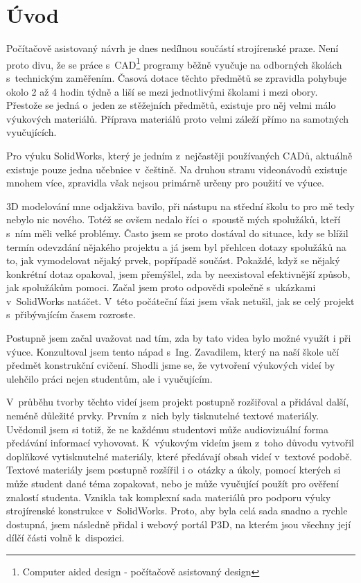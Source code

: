 \chapter*{Úvod}
Počítačově asistovaný návrh je dnes nedílnou součástí strojírenské praxe.
Není proto divu, že se práce s~CAD\footnote{Computer aided design - počítačově asistovaný design} programy běžně vyučuje na odborných školách s~technickým zaměřením.
Časová dotace těchto předmětů se zpravidla pohybuje okolo 2 až 4 hodin týdně a liší se mezi jednotlivými školami i mezi obory.
Přestože se jedná o~jeden ze stěžejních předmětů, existuje pro něj velmi málo výukových materiálů.
Příprava materiálů proto velmi záleží přímo na samotných vyučujících.

Pro výuku SolidWorks, který je jedním z~nejčastěji používaných CADů, aktuálně existuje pouze jedna učebnice v~češtině.
Na druhou stranu videonávodů existuje mnohem více, zpravidla však nejsou primárně určeny pro použití ve výuce.

3D modelování mne odjakživa bavilo, při nástupu na střední školu to pro mě tedy nebylo nic nového.
Totéž se ovšem nedalo říci o~spoustě mých spolužáků, kteří s~ním měli velké problémy.
Často jsem se proto dostával do situace, kdy se blížil termín odevzdání nějakého projektu a já jsem byl přehlcen dotazy spolužáků na to, jak vymodelovat nějaký prvek, popřípadě součást.
Pokaždé, když se nějaký konkrétní dotaz opakoval, jsem přemýšlel, zda by neexistoval efektivnější způsob, jak spolužákům pomoci.
Začal jsem proto odpovědi společně s~ukázkami v~SolidWorks natáčet.
V~této počáteční fázi jsem však netušil, jak se celý projekt s~přibývajícím časem rozroste.

Postupně jsem začal uvažovat nad tím, zda by tato videa bylo možné využít i při výuce.
Konzultoval jsem tento nápad s~Ing. Zavadilem, který na naší škole učí předmět konstrukční cvičení.
Shodli jsme se, že vytvoření výukových videí by ulehčilo práci nejen studentům, ale i vyučujícím.

V~průběhu tvorby těchto videí jsem projekt postupně rozšiřoval a přidával další, neméně důležité prvky.
Prvním z~nich byly tisknutelné textové materiály.
Uvědomil jsem si totiž, že ne každému studentovi může audiovizuální forma předávání informací vyhovovat.
K~výukovým videím jsem z~toho důvodu vytvořil doplňkové vytisknutelné materiály, které předávají obsah videí v~textové podobě.
Textové materiály jsem postupně rozšířil i o~otázky a úkoly, pomocí kterých si může student dané téma zopakovat, nebo je může vyučující použít pro ověření znalostí studenta.
Vznikla tak komplexní sada materiálů pro podporu výuky strojírenské konstrukce v~SolidWorks.
Proto, aby byla celá sada snadno a rychle dostupná, jsem následně přidal i webový portál P3D, na kterém jsou všechny její dílčí části volně k~dispozici.

